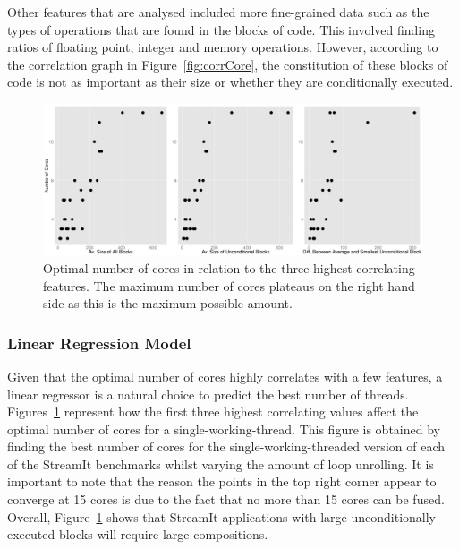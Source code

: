 Other features that are analysed included more fine-grained data such as the types of operations that are found in the blocks of code.
This involved finding ratios of floating point, integer and memory operations.
However, according to the correlation graph in Figure~\ref{fig:corrCore}, the constitution of these blocks of code is not as important as their size or whether they are conditionally executed.

\begin{figure}[t]
  \center
  \includegraphics[width=1\textwidth]{streamit-paper/graphics/lineargraphs.pdf}
  \caption{Optimal number of cores in relation to the three highest correlating features. The maximum number of cores plateaus on the right hand side as this is the maximum possible amount.}\label{fig:maxav}
\end{figure}

\subsubsection{Linear Regression Model}
Given that the optimal number of cores highly correlates with a few features, a linear regressor is a natural choice to predict the best number of threads.
Figures~\ref{fig:maxav} represent how the first three highest correlating values affect the optimal number of cores for a single-working-thread.
This figure is obtained by finding the best number of cores for the single-working-threaded version of each of the StreamIt benchmarks whilst varying the amount of loop unrolling.
It is important to note that the reason the points in the top right corner appear to converge at 15 cores is due to the fact that no more than 15 cores can be fused.
Overall, Figure~\ref{fig:maxav} shows that StreamIt applications with large unconditionally executed blocks will require large compositions.


